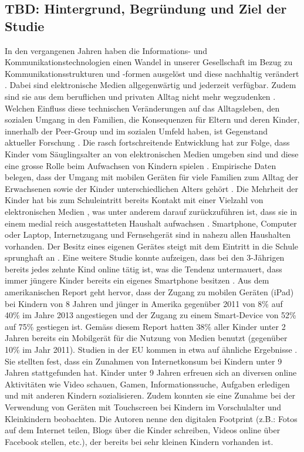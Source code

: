 \subsection{TBD: Hintergrund, Begründung und Ziel der Studie}
In den vergangenen Jahren haben die Informations- und Kommunikationstechnologien einen Wandel in unserer Gesellschaft im Bezug zu Kommunikationsstrukturen und -formen ausgelöst und diese nachhaltig verändert \cite{Hasebrink2009, Bms2013}. Dabei sind elektronische Medien allgegenwärtig und jederzeit verfügbar. Zudem sind sie aus dem beruflichen und privaten Alltag nicht mehr wegzudenken \cite{Bmfsfj2013}. Welchen Einfluss diese technischen Veränderungen auf das Alltagsleben, den sozialen Umgang in den Familien, die Konsequenzen für Eltern und deren Kinder, innerhalb der Peer-Group und im sozialen Umfeld haben, ist Gegenstand aktueller Forschung \cite{Olafsson2014}. Die rasch fortschreitende Entwicklung hat zur Folge, dass Kinder vom Säuglingsalter an von elektronischen Medien umgeben sind und diese eine grosse Rolle beim Aufwachsen von Kindern spielen \cite{Feierabend2015, Divsi2015}. Empirische Daten belegen, dass der Umgang mit mobilen Geräten für viele Familien zum Alltag der Erwachsenen sowie der Kinder unterschiedlichen Alters gehört \cite{Wagner2016}. Die Mehrheit der Kinder hat bis zum Schuleintritt bereits Kontakt mit einer Vielzahl von elektronischen Medien \cite{Feierabend2015}, was unter anderem darauf zurückzuführen ist, dass sie in einem medial reich ausgestatteten Haushalt aufwachsen \cite{Suter2015}. Smartphone, Computer oder Laptop, Internetzugang und Fernsehgerät sind in nahezu allen Haushalten vorhanden. Der Besitz eines eigenen Gerätes steigt mit dem Eintritt in die Schule sprunghaft an \cite{Feierabend2015a}. Eine weitere Studie konnte aufzeigen, dass bei den 3-Jährigen bereits jedes zehnte Kind online tätig ist, was die Tendenz untermauert, dass immer jüngere Kinder bereits ein eigenes Smartphone besitzen \cite{Divsi2015}. Aus dem amerikanischen Report  geht hervor, dass der Zugang zu mobilen Geräten (iPad) bei Kindern von 8 Jahren und jünger in Amerika gegenüber 2011 von 8\% auf 40\% im Jahre 2013 angestiegen und der Zugang zu einem Smart-Device von 52\% auf 75\% gestiegen ist. Gemäss diesem Report hatten 38\% aller Kinder unter 2 Jahren bereits ein Mobilgerät für die Nutzung von Medien benutzt (gegenüber 10\% im Jahr 2011). Studien in der EU kommen in etwa auf ähnliche Ergebnisse \cite{Holloway2013}. Sie stellten fest, dass ein Zunahmen von Internetkonsum bei Kindern unter 9 Jahren stattgefunden hat. Kinder unter 9 Jahren erfreuen sich an diversen online Aktivitäten wie Video schauen, Gamen, Informationssuche, Aufgaben erledigen 
und mit anderen Kindern sozialisieren. Zudem konnten sie eine Zunahme bei der Verwendung von Geräten mit Touchscreen bei Kindern im Vorschulalter und Kleinkindern beobachten. Die Autoren nenne den digitalen Footprint (z.B.: Fotos auf dem Internet teilen, Blogs über die Kinder schreiben, Videos online über Facebook stellen, etc.), der bereits bei sehr kleinen Kindern vorhanden ist.


